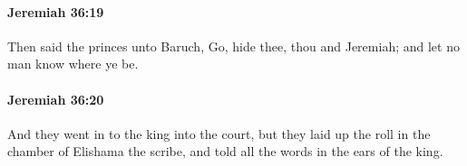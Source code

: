 		\paragraph{Jeremiah 36:19} %
			\label{JEREMIAH-36-19}

			Then said the princes unto Baruch, Go, hide thee, thou and Jeremiah; and let no man know where ye be.


		\paragraph{Jeremiah 36:20} %
			\label{JEREMIAH-36-20}

			And they went in to the king into the court, but they laid up the roll in the chamber of Elishama the scribe, and told all the words in the ears of the king.


